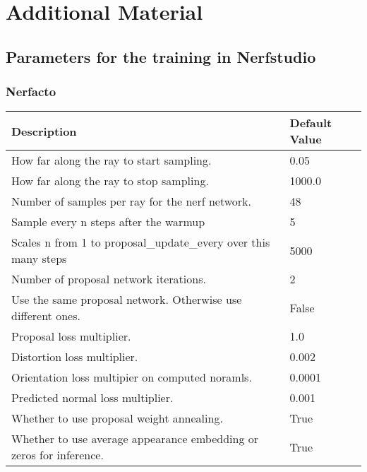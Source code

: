 \chapter{Additional Material} \label{app:additional}

\section{Parameters for the training in Nerfstudio}

\subsection{Nerfacto}
\begin{table}[h]
    \begin{tabular}{|l|l|}
    \hline
    Description                                             & Default Value \\
    \hline
    How far along the ray to start sampling.                & 0.05 \\
    How far along the ray to stop sampling.                 & 1000.0 \\
    Number of samples per ray for the nerf network.         & 48 \\
    Sample every n steps after the warmup                   & 5 \\
    Scales n from 1 to proposal\_update\_every over this many steps & 5000 \\
    Number of proposal network iterations.                  & 2 \\
    Use the same proposal network. Otherwise use different ones. & False \\
    Proposal loss multiplier.                               & 1.0 \\
    Distortion loss multiplier.                             & 0.002 \\
    Orientation loss multipier on computed noramls.         & 0.0001 \\
    Predicted normal loss multiplier.                       & 0.001 \\
    Whether to use proposal weight annealing.               & True \\
    Whether to use average appearance embedding or zeros for inference. & True \\

\end{tabular}
\end{table}
